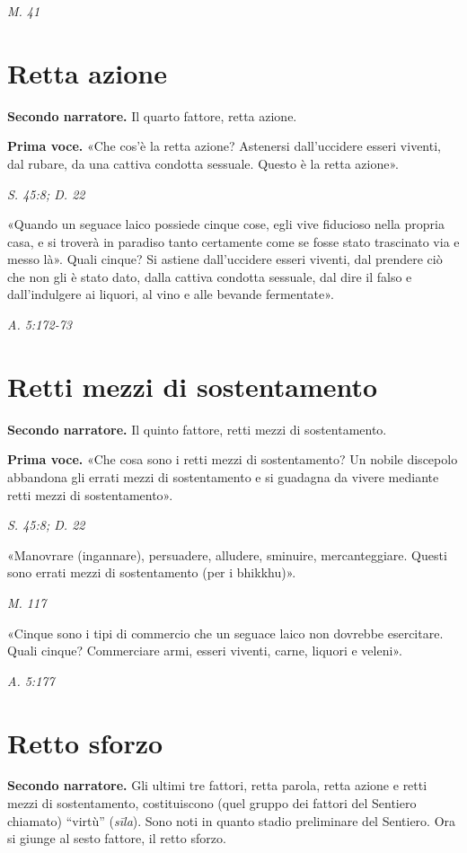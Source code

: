 \emph{M. 41}


\hypertarget{x-retta-azione}{\section*{Retta azione}}
\textbf{Secondo narratore.} Il quarto fattore, retta azione.


\textbf{Prima voce.} «Che cos’è la retta azione? Astenersi dall’uccidere esseri
viventi, dal rubare, da una cattiva condotta sessuale. Questo è la retta
azione».


\emph{S. 45:8; D. 22}


«Quando un seguace laico possiede cinque cose, egli vive fiducioso nella
propria casa, e si troverà in paradiso tanto certamente come se fosse
stato trascinato via e messo là». Quali cinque? Si astiene dall’uccidere
esseri viventi, dal prendere ciò che non gli è stato dato, dalla cattiva
condotta sessuale, dal dire il falso e dall’indulgere ai liquori, al
vino e alle bevande fermentate».


\emph{A. 5:172-73}


\hypertarget{x-retti-mezzi-di-sostentamento}{\section*{Retti mezzi di sostentamento}}
\textbf{Secondo narratore.} Il quinto fattore, retti mezzi di sostentamento.


\textbf{Prima voce.} «Che cosa sono i retti mezzi di sostentamento? Un nobile
discepolo abbandona gli errati mezzi di sostentamento e si guadagna da
vivere mediante retti mezzi di sostentamento».


\emph{S. 45:8; D. 22}


«Manovrare (ingannare), persuadere, alludere, sminuire, mercanteggiare.
Questi sono errati mezzi di sostentamento (per i bhikkhu)».


\emph{M. 117}


«Cinque sono i tipi di commercio che un seguace laico non dovrebbe
esercitare. Quali cinque? Commerciare armi, esseri viventi, carne,
liquori e veleni».


\emph{A. 5:177}


\hypertarget{x-retto-sforzo}{\section*{Retto sforzo}}
\textbf{Secondo narratore.} Gli ultimi tre fattori, retta parola, retta azione e
retti mezzi di sostentamento, costituiscono (quel gruppo dei fattori del
Sentiero chiamato) “virtù” (\emph{sīla}). Sono noti in quanto stadio
preliminare del Sentiero. Ora si giunge al sesto fattore, il retto
sforzo.


